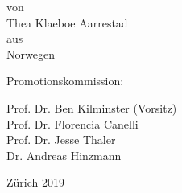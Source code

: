 \begin{center}

\vspace{0.3in}
von \\
\vspace{0.05in}
{\large Thea Klaeboe Aarrestad} \\
aus \\
Norwegen \\
\par
\vspace{0.6in}


Promotionskommission:\\
\par
\vspace{0.1in}


Prof. Dr. Ben Kilminster (Vorsitz)\\
Prof. Dr. Florencia Canelli\\
Prof. Dr. Jesse Thaler\\
Dr. Andreas Hinzmann\\

\par
\vspace{0.4in}


Z\"urich 2019

\end{center}
